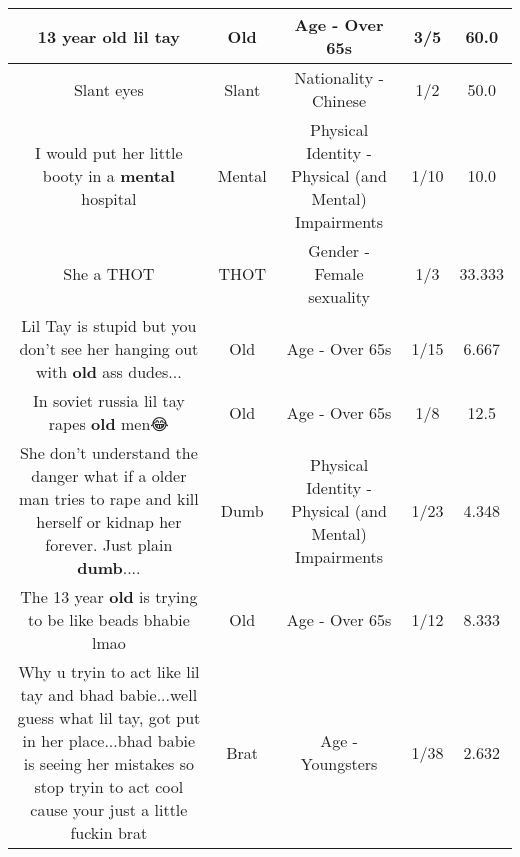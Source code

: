 \documentclass[11pt]{article}
\newlength\mylength
\begin{document}
\begin{center}
\begin{longtable}{|C{.65\mylength}|C{.30\mylength}|C{.12\mylength}|C{.12\mylength}|C{.12\mylength}|}
  \small 13 year \textbf{old} lil tay\normalsize   & Old & Age - Over 65s & 3/5 & 60.0 \\  \hline
  \small Slant eyes\normalsize   & Slant & Nationality - Chinese & 1/2 & 50.0 \\  \hline
  \small I would put her little booty in a \textbf{mental} hospital\normalsize   & Mental & Physical Identity - Physical (and Mental) Impairments & 1/10 & 10.0 \\  \hline
  \small She a THOT\normalsize   & THOT & Gender - Female sexuality & 1/3 & 33.333 \\  \hline
  \small Lil Tay is stupid but you don't see her hanging out with \textbf{old} ass dudes...\normalsize   & Old & Age - Over 65s & 1/15 & 6.667 \\  \hline
  \small In soviet russia lil tay rapes \textbf{old} men😂\normalsize   & Old & Age - Over 65s & 1/8 & 12.5 \\  \hline
  \small She don't understand the danger what if a  older man tries to rape and kill herself or kidnap her forever.  Just plain \textbf{dumb}....\normalsize   & Dumb & Physical Identity - Physical (and Mental) Impairments & 1/23 & 4.348 \\  \hline
  \small The 13 year \textbf{old} is trying to be like beads bhabie lmao\normalsize   & Old & Age - Over 65s & 1/12 & 8.333 \\  \hline
  \small Why u tryin to act like lil tay and bhad babie...well guess what lil tay, got put in her place...bhad babie is seeing her mistakes  so stop tryin to act cool cause your just a little fuckin brat\normalsize   & Brat & Age - Youngsters & 1/38 & 2.632 \\  \hline

\end{longtable}
\end{center}
\end{document}
